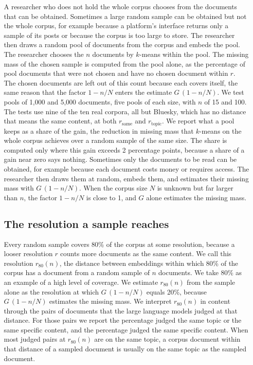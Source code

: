 A researcher who does not hold the whole corpus chooses from the documents that can be obtained. Sometimes a large random sample can be obtained but not the whole corpus, for example because a platform's interface returns only a sample of its posts or because the corpus is too large to store. The researcher then draws a random pool of documents from the corpus and embeds the pool. The researcher chooses the $n$ documents by $k$-means within the pool. The missing mass of the chosen sample is computed from the pool alone, as the percentage of pool documents that were not chosen and have no chosen document within $r$. The chosen documents are left out of this count because each covers itself, the same reason that the factor $1 - n/N$ enters the estimate $G\,(1 - n/N)$. We test pools of 1{,}000 and 5{,}000 documents, five pools of each size, with $n$ of 15 and 100. The tests use nine of the ten real corpora, all but Bluesky, which has no distance that means the same content, at both $r_{\mathrm{same}}$ and $r_{\mathrm{topic}}$. We report what a pool keeps as a share of the gain, the reduction in missing mass that $k$-means on the whole corpus achieves over a random sample of the same size. The share is computed only where this gain exceeds 2 percentage points, because a share of a gain near zero says nothing. Sometimes only the documents to be read can be obtained, for example because each document costs money or requires access. The researcher then draws them at random, embeds them, and estimates their missing mass with $G\,(1 - n/N)$. When the corpus size $N$ is unknown but far larger than $n$, the factor $1 - n/N$ is close to 1, and $G$ alone estimates the missing mass.

\subsection{The resolution a sample reaches}
\label{sup:resolution}

Every random sample covers 80\% of the corpus at some resolution, because a looser resolution $r$ counts more documents as the same content. We call this resolution $r_{80}(n)$, the distance between embeddings within which 80\% of the corpus has a document from a random sample of $n$ documents. We take 80\% as an example of a high level of coverage. We estimate $r_{80}(n)$ from the sample alone as the resolution at which $G\,(1 - n/N)$ equals 20\%, because $G\,(1 - n/N)$ estimates the missing mass. We interpret $r_{80}(n)$ in content through the pairs of documents that the large language models judged at that distance. For those pairs we report the percentage judged the same topic or the same specific content, and the percentage judged the same specific content. When most judged pairs at $r_{80}(n)$ are on the same topic, a corpus document within that distance of a sampled document is usually on the same topic as the sampled document.

